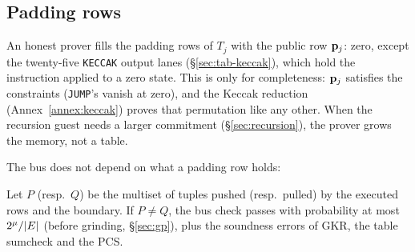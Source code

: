 \subsection{Padding rows}\label{sec:e2e-pad}

An honest prover fills the padding rows of $T_j$ with the public row $\mathbf{p}_{j}$: zero, except the twenty-five \texttt{KECCAK} output lanes (\S\ref{sec:tab-keccak}), which hold the instruction applied to a zero state. This is only for completeness: $\mathbf{p}_{j}$ satisfies the constraints (\texttt{JUMP}'s vanish at zero), and the Keccak reduction (Annex~\ref{annex:keccak}) proves that permutation like any other. When the recursion guest needs a larger commitment (\S\ref{sec:recursion}), the prover grows the memory, not a table.

The bus does not depend on what a padding row holds:

\begin{proposition}\label{prop:pad}
Let $P$ (resp.\ $Q$) be the multiset of tuples pushed (resp.\ pulled) by the executed rows and the boundary. If $P\neq Q$, the bus check passes with probability at most $2^{\mu}/|E|$ (before grinding, \S\ref{sec:gp}), plus the soundness errors of GKR, the table sumcheck and the PCS.
\end{proposition}

